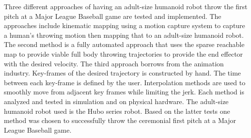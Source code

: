 Three different approaches of having an adult-size humanoid robot throw the first pitch at a Major League Baseball game are tested and implemented.  The approaches include kinematic mapping using a motion capture system to capture a human's throwing motion then mapping that to an adult-size humanoid robot.  The second method is a fully automated approach that uses the sparse reachable map to provide viable full body throwing trajectories to provide the end effector with the desired velocity.  The third approach borrows from the animation industry.  Key-frames of the desired trajectory is constructed by hand.  The time between each key-frame is defined by the user.  Interpolation methods are used to smoothly move from adjacent key frames while limiting the jerk.  Each method is analyzed and tested in simulation and on physical hardware.  The adult-size humanoid robot used is the Hubo series robot.  Based on the latter tests one method was chosen to successfully throw the ceremonial first pitch at a Major League Baseball game.